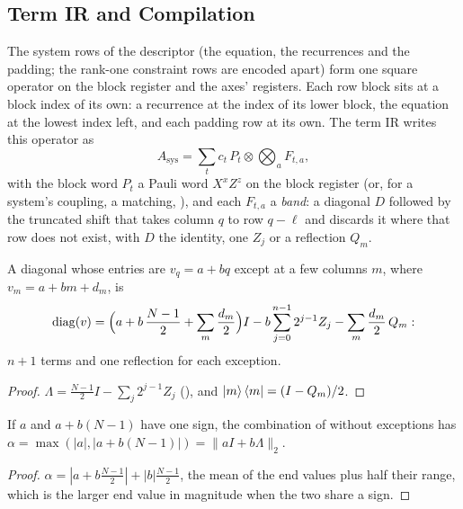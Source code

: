 \subsection{Term IR and Compilation}
\label{app:term-ir}

The system rows of the descriptor (the equation, the recurrences and the padding; the rank-one constraint rows are encoded apart) form one square operator on the block register and the axes' registers. Each row block sits at a block index of its own: a recurrence at the index of its lower block, the equation at the lowest index left, and each padding row at its own. The term IR writes this operator as
\begin{equation}
    A_{\mathrm{sys}}=\sum_tc_t\,P_t\otimes\bigotimes_aF_{t,a},
    \label{eq:app-term-ir}
\end{equation}
with the block word $P_t$ a Pauli word $X^xZ^z$ on the block register (or, for a system's coupling, a matching, ), and each $F_{t,a}$ a \emph{band}: a diagonal $D$ followed by the truncated shift that takes column $q$ to row $q-\ell$ and discards it where that row does not exist, with $D$ the identity, one $Z_j$ or a reflection $Q_m$.

\begin{lemma}
\label{lem:affine-band}
A diagonal whose entries are $v_q=a+bq$ except at a few columns $m$, where $v_m=a+bm+d_m$, is
\begin{equation*}
    \operatorname{diag}(v)=\Bigl(a+b\,\frac{N-1}{2}+\sum_m\frac{d_m}{2}\Bigr)I-b\sum_{j=0}^{n-1}2^{j-1}Z_j-\sum_m\frac{d_m}{2}\,Q_m :
\end{equation*}
$n+1$ terms and one reflection for each exception.
\end{lemma}
\begin{proof}
$\Lambda=\tfrac{N-1}{2}I-\sum_j2^{j-1}Z_j$ (), and $\ket{m}\bra{m}=(I-Q_m)/2$.
\end{proof}

\begin{lemma}
\label{lem:affine-tight}
If $a$ and $a+b(N-1)$ have one sign, the combination of  without exceptions has $\alpha=\max(|a|,|a+b(N-1)|)=\|aI+b\Lambda\|_2$.
\end{lemma}
\begin{proof}
$\alpha=|a+b\tfrac{N-1}{2}|+|b|\tfrac{N-1}{2}$, the mean of the end values plus half their range, which is the larger end value in magnitude when the two share a sign.
\end{proof}

